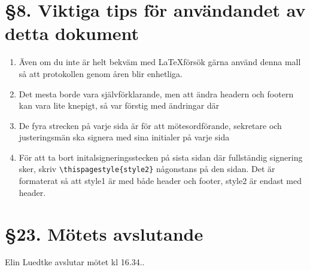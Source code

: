 \documentclass[a4paper, 11pt]{article}
\begin{document}
    \section*{§8. Viktiga tips för användandet av detta dokument}
    \begin{enumerate}[label=(\alph*)]
    \item Även om du inte är helt bekväm med \LaTeX försök gärna använd denna mall så att protokollen genom åren blir enhetliga.
    \item Det mesta borde vara självförklarande, men att ändra headern och footern kan vara lite knepigt, så var förstig med ändringar där
    \item De fyra strecken på varje sida är för att mötesordförande, sekretare och justeringsmän ska signera med sina initialer på varje sida
    \item För att ta bort initalsigneringsstecken på sista sidan där fullständig signering sker, skriv 	\verb+\thispagestyle{style2}+ någonstans på den sidan. Det är formaterat så att style1 är med både header och footer, style2 är endast med header.
    \end{enumerate}
\newpage
    \section*{§23. Mötets avslutande}
Elin Luedtke avslutar mötet kl 16.34..
\thispagestyle{style2}
\makebox{}\\
\makebox{}\\
\makebox{}\\
\makebox[0.4\linewidth]{\rule{0.4\linewidth}{0.4pt}} \hspace{1cm} \makebox[0.4\linewidth]{\rule{0.4\linewidth}{0.4pt}} \hspace{1cm}\\
 \hspace{1cm}
 \hspace{1cm}\\
 \hspace{1cm}
 \hspace{1cm}\\
\makebox{}\\
\makebox{}\\
\makebox{}\\
\noindent\makebox[0.4\linewidth]{\rule{0.4\linewidth}{0.4pt}} \hspace{1cm} \makebox[0.4\linewidth]{\rule{0.4\linewidth}{0.4pt}} \hspace{1cm}\\
 \hspace{1cm}
 \hspace{1cm}\\
 \hspace{1cm}
 \hspace{1cm}\\
\end{document}
